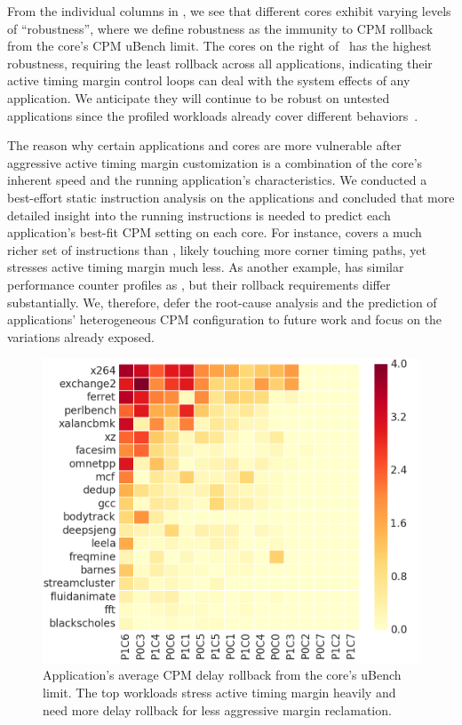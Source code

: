 From the individual columns in , we see that different cores exhibit varying levels of ``robustness'', where we define robustness as the immunity to CPM rollback from the core's CPM uBench limit. The cores on the right of~ has the highest robustness, requiring the least rollback across all applications, indicating their active timing margin control loops can deal with the system effects of any application. We anticipate they will continue to be robust on untested applications since the profiled workloads already cover different behaviors~\cite{song2018spec}.

The reason why certain applications and cores are more vulnerable after aggressive active timing margin customization is a combination of the core's inherent speed and the running application's characteristics. We conducted a best-effort static instruction analysis on the applications and concluded that more detailed insight into the running instructions is needed to predict each application's best-fit CPM setting on each core. For instance,  covers a much richer set of instructions than , likely touching more corner timing paths, yet stresses active timing margin much less. As another example,  has similar performance counter profiles as , but their rollback requirements differ substantially. We, therefore, defer the root-cause analysis and the prediction of applications' heterogeneous CPM configuration to future work and focus on the variations already exposed.

\begin{figure}[t]
  \centering
  \includegraphics[trim=0 0 0 0,clip,width=\linewidth]{graphs/process//spec-limit-dist/app-rollback.png}
  \caption{Application's average CPM delay rollback from the core's uBench limit. The top workloads stress active timing margin heavily and need more delay rollback for less aggressive margin reclamation.}
  \label{fig:app-cpm-heactive timing marginap}
\end{figure}


